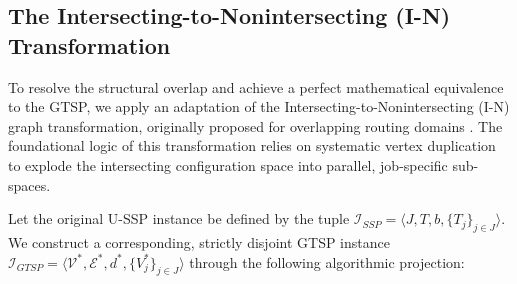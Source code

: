 \documentclass[11pt, a4paper]{book}
\begin{document}
	\subsection{The Intersecting-to-Nonintersecting (I-N) Transformation}
	
	To resolve the structural overlap and achieve a perfect mathematical equivalence to the GTSP, we apply an adaptation of the Intersecting-to-Nonintersecting (I-N) graph transformation, originally proposed for overlapping routing domains %
	. The foundational logic of this transformation relies on systematic vertex duplication to explode the intersecting configuration space into parallel, job-specific sub-spaces.
	
	Let the original U-SSP instance be defined by the tuple $\mathcal{I}_{SSP} = \langle J, T, b, \{T_j\}_{j \in J} \rangle$. We construct a corresponding, strictly disjoint GTSP instance $\mathcal{I}_{GTSP} = \langle \mathcal{V}^*, \mathcal{E}^*, d^*, \{V_j^*\}_{j \in J} \rangle$ through the following algorithmic projection:
	
\end{document}

